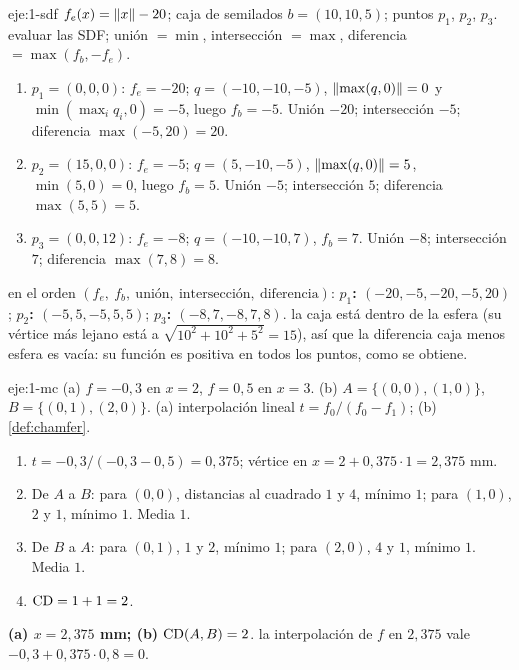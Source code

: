 \begin{solucion}{eje:1-sdf}
\datos $f_e(x)=\lVert x\rVert-20$; caja de semilados $b=(10,10,5)$; puntos $p_1$, $p_2$, $p_3$.
\planteamiento evaluar las SDF; unión $=\min$, intersección $=\max$, diferencia $=\max(f_b,-f_e)$.
\pasos
\begin{enumerate}[label=\arabic*.]
  \item $p_1=(0,0,0)$: $f_e=-20$; $q=(-10,-10,-5)$, $\lVert\max(q,0)\rVert=0$ y $\min(\max_iq_i,0)=-5$, luego $f_b=-5$. Unión $-20$; intersección $-5$; diferencia $\max(-5,20)=20$.
  \item $p_2=(15,0,0)$: $f_e=-5$; $q=(5,-10,-5)$, $\lVert\max(q,0)\rVert=5$, $\min(5,0)=0$, luego $f_b=5$. Unión $-5$; intersección $5$; diferencia $\max(5,5)=5$.
  \item $p_3=(0,0,12)$: $f_e=-8$; $q=(-10,-10,7)$, $f_b=7$. Unión $-8$; intersección $7$; diferencia $\max(7,8)=8$.
\end{enumerate}
\resultado en el orden $(f_e,\ f_b,\ \text{unión},\ \text{intersección},\ \text{diferencia})$: \textbf{$p_1$: $(-20,-5,-20,-5,20)$}; \textbf{$p_2$: $(-5,5,-5,5,5)$}; \textbf{$p_3$: $(-8,7,-8,7,8)$}.
\comprobacion la caja está dentro de la esfera (su vértice más lejano está a $\sqrt{10^2+10^2+5^2}=15$), así que la diferencia caja menos esfera es vacía: su función es positiva en todos los puntos, como se obtiene.
\end{solucion}

\begin{solucion}{eje:1-mc}
\datos (a) $f=-0{,}3$ en $x=2$, $f=0{,}5$ en $x=3$. (b) $A=\{(0,0),(1,0)\}$, $B=\{(0,1),(2,0)\}$.
\planteamiento (a) interpolación lineal $t=f_0/(f_0-f_1)$; (b) \cref{def:chamfer}.
\pasos
\begin{enumerate}[label=\arabic*.]
  \item $t=-0{,}3/(-0{,}3-0{,}5)=0{,}375$; vértice en $x=2+0{,}375\cdot 1=2{,}375$ mm.
  \item De $A$ a $B$: para $(0,0)$, distancias al cuadrado $1$ y $4$, mínimo $1$; para $(1,0)$, $2$ y $1$, mínimo $1$. Media $1$.
  \item De $B$ a $A$: para $(0,1)$, $1$ y $2$, mínimo $1$; para $(2,0)$, $4$ y $1$, mínimo $1$. Media $1$.
  \item $\operatorname{CD}=1+1=2$.
\end{enumerate}
\resultado \textbf{(a) $x=2{,}375$ mm; (b) $\operatorname{CD}(A,B)=2$}.
\comprobacion la interpolación de $f$ en $2{,}375$ vale $-0{,}3+0{,}375\cdot 0{,}8=0$.
\end{solucion}

